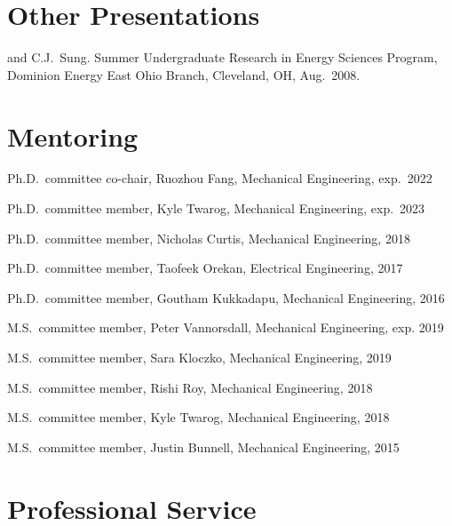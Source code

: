 \section{{\sectionfont Other Presentations}}

\begin{bibmune}
\item {} and C.J.\ Sung.  Summer Undergraduate Research in Energy Sciences Program,
        Dominion Energy East Ohio Branch, Cleveland, OH, Aug.\ 2008.\\
\end{bibmune}

\vspace{\baselineskip}

\section{\sectionfont{} Mentoring}

\begin{lonelist}
\item Ph.D.\ committee co-chair, Ruozhou Fang, Mechanical Engineering, exp.\ 2022
\item Ph.D.\ committee member, Kyle Twarog, Mechanical Engineering, exp.\ 2023
\item Ph.D.\ committee member, Nicholas Curtis, Mechanical Engineering, 2018
\item Ph.D.\ committee member, Taofeek Orekan, Electrical Engineering, 2017
\item Ph.D.\ committee member, Goutham Kukkadapu, Mechanical Engineering, 2016
\item M.S.\ committee member, Peter Vannorsdall, Mechanical Engineering, exp. 2019
\item M.S.\ committee member, Sara Kloczko, Mechanical Engineering, 2019
\item M.S.\ committee member, Rishi Roy, Mechanical Engineering, 2018
\item M.S.\ committee member, Kyle Twarog, Mechanical Engineering, 2018
\item M.S.\ committee member, Justin Bunnell, Mechanical Engineering, 2015
\end{lonelist}

\vspace{\baselineskip}

\section{{\sectionfont Professional Service}}

